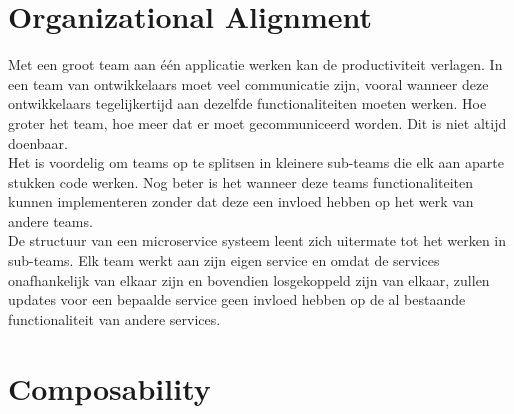 \documentclass[pdftex,a4paper,12pt,twoside]{report}
\begin{document}
\section{Organizational Alignment}
\label{sec:organizational-alignment}

Met een groot team aan één applicatie werken kan de productiviteit verlagen. In een team van ontwikkelaars moet veel communicatie zijn, vooral wanneer deze ontwikkelaars tegelijkertijd aan dezelfde functionaliteiten moeten werken. Hoe groter het team, hoe meer dat er moet gecommuniceerd worden. Dit is niet altijd doenbaar.
\\
Het is voordelig om teams op te splitsen in kleinere sub-teams die elk aan aparte stukken code werken. Nog beter is het wanneer deze teams functionaliteiten kunnen implementeren zonder dat deze een invloed hebben op het werk van andere teams.
\\
De structuur van een microservice systeem leent zich uitermate tot het werken in sub-teams. Elk team werkt aan zijn eigen service en omdat de services onafhankelijk van elkaar zijn en bovendien losgekoppeld zijn van elkaar, zullen updates voor een bepaalde service geen invloed hebben op de al bestaande functionaliteit van andere services.

\section{Composability}
\label{sec:composability}
\end{document}
